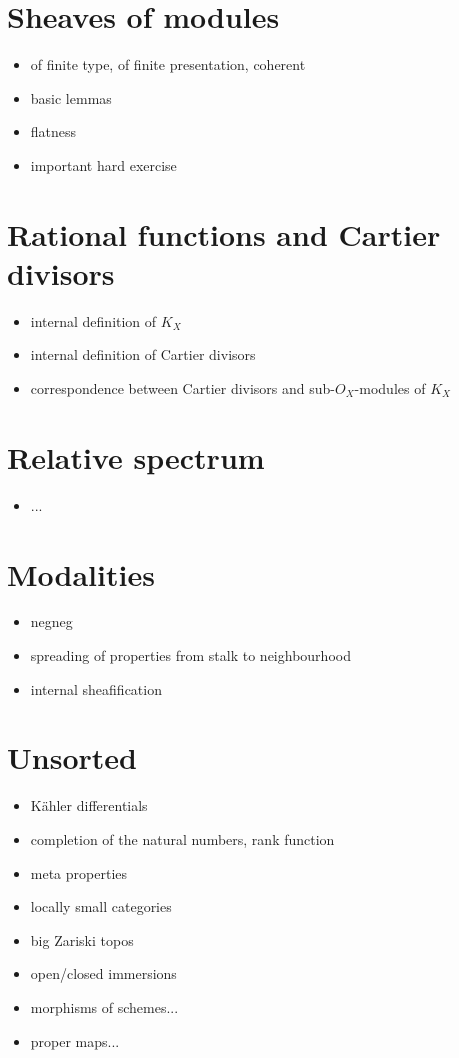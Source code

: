 \documentclass{amsart}
\begin{document}
\section{Sheaves of modules}
\begin{itemize}
\item of finite type, of finite presentation, coherent
\item basic lemmas
\item flatness
\item important hard exercise
\end{itemize}

\section{Rational functions and Cartier divisors}
\begin{itemize}
\item internal definition of $K_X$
\item internal definition of Cartier divisors
\item correspondence between Cartier divisors and sub-$O_X$-modules of $K_X$
\end{itemize}

\section{Relative spectrum}
\begin{itemize}
\item ...
\end{itemize}

\section{Modalities}
\begin{itemize}
\item negneg
\item spreading of properties from stalk to neighbourhood
\item internal sheafification
\end{itemize}

\section{Unsorted}
\begin{itemize}
\item Kähler differentials
\item completion of the natural numbers, rank function
\item meta properties
\item locally small categories
\item big Zariski topos
\item open/closed immersions
\item morphisms of schemes...
\item proper maps...
\end{itemize}
\end{document}
